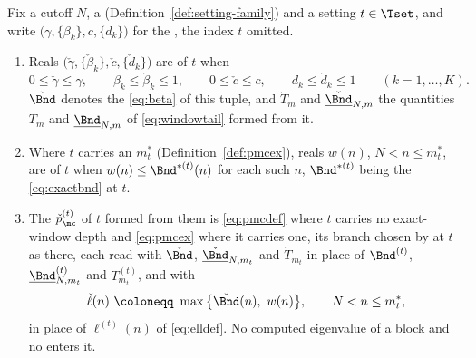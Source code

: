 \begin{definition}\label{def:enclosed-weight}
Fix a cutoff $N$, a 
(Definition~\ref{def:setting-family}) and a setting $t\in\Tset$, and write
$\big(\gamma,\{\beta_k\},c,\{d_k\}\big)$ for the
, the index $t$ omitted.
\begin{enumerate}[label=(\roman*),leftmargin=2.4em]
\item Reals $\big(\check\gamma,\{\check\beta_k\},\check c,\{\check d_k\}\big)$
  are
   of $t$ when
  \begin{equation}\label{eq:enclosed-directions}
    0\le\check\gamma\le\gamma,\qquad \beta_k\le\check\beta_k\le1,\qquad
    0\le\check c\le c,\qquad d_k\le\check d_k\le1
    \qquad(k=1,\dots,K).
  \end{equation}
  $\check\Bnd$ denotes the  \eqref{eq:beta} of this
  tuple, and $\check T_m$ and $\underline{\check\Bnd}_{N,m}$ the quantities
  $T_m$ and $\underline{\Bnd}_{N,m}$ of \eqref{eq:windowtail} formed from it.
\item Where $t$ carries an  $m^{\ast}_t$
  (Definition~\ref{def:pmcex}), reals $w(n)$, $N<n\le m^{\ast}_t$, are
   of $t$ when
  $w(n)\le\Bnd^{\ast(t)}(n)$ for each such $n$, $\Bnd^{\ast(t)}$ being the
   \eqref{eq:exactbnd} at $t$.
\item The
   $\check p^{(t)}_{\mc}$ of $t$ formed
  from them is \eqref{eq:pmcdef} where $t$ carries no exact-window depth and
  \eqref{eq:pmcex} where it carries one, its branch chosen by
   at $t$ as there, each read with $\check\Bnd$,
  $\underline{\check\Bnd}_{N,m_t}$ and $\check T_{m_t}$ in place of
  $\Bnd^{(t)}$, $\underline{\Bnd}^{(t)}_{N,m_t}$ and $T^{(t)}_{m_t}$, and with
  \begin{equation}\label{eq:enclosed-ell}
    \check\ell(n)\ \coloneqq\ \max\big\{\check\Bnd(n),\ w(n)\big\},
    \qquad N<n\le m^{\ast}_t ,
  \end{equation}
  in place of $\ell^{(t)}(n)$ of \eqref{eq:elldef}. No computed eigenvalue of
  a block and no  enters it.
\end{enumerate}
\end{definition}
